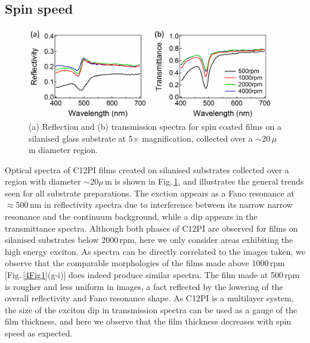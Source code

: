 \subsection{Spin speed}
\begin{figure}[ht]
\centering
\includegraphics[width=\textwidth]{Fig2}
\caption{(a) Reflection and (b) transmission spectra for spin coated films on a silanised glass substrate at 5$\times$ magnification, collected over a $\sim20\,\mu$m diameter region.}
\label{4Fig2}
\end{figure}
Optical spectra of C12PI films created on silanised substrates collected over a region with diameter $\sim20\mu$\,m is shown in Fig.\,\ref{4Fig2}, and illustrates the general trends seen for all substrate preparations. The exction appears as a Fano resonance at $\approx500\,$nm in reflectivity spectra due to interference between its narrow narrow resonance and the continuum background, while a dip appears in the transmittance spectra. Although both phases of C12PI are observed for films on silanised substrates below 2000\,rpm, here we only consider areas exhibiting the high energy exciton. As spectra can be directly correlated to the images taken, we observe that the comparable morphologies of the films made above 1000\,rpm [Fig.\,\ref{4Fig1}(g-i)] does indeed produce similar spectra. The film made at 500\,rpm is rougher and less uniform in images, a fact reflected by the lowering of the overall reflectivity and Fano resonance shape. As C12PI is a multilayer system, the size of the exciton dip in transmission spectra can be used as a gauge of the film thickness, and here we observe that the film thickness decreases with spin speed as expected.

